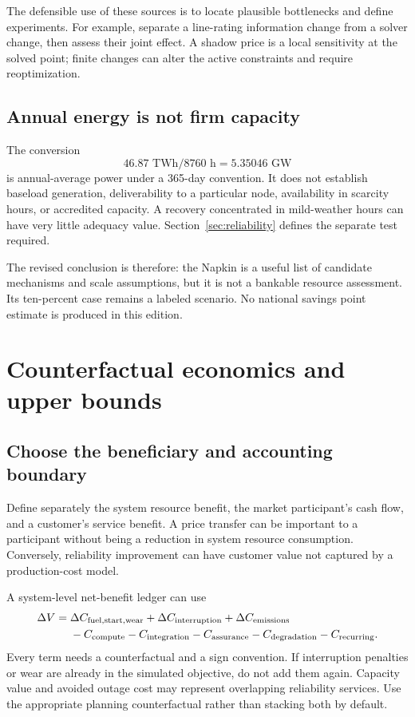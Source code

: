 \documentclass[11pt,letterpaper]{article}
\begin{document}
The defensible use of these sources is to locate plausible bottlenecks and define experiments. For example, separate a line-rating information change from a solver change, then assess their joint effect. A shadow price is a local sensitivity at the solved point; finite changes can alter the active constraints and require reoptimization.

\subsection{Annual energy is not firm capacity}
The conversion
\[
 46.87\text{ TWh}/8760\text{ h}=5.35046\text{ GW}
\]
is annual-average power under a 365-day convention. It does not establish baseload generation, deliverability to a particular node, availability in scarcity hours, or accredited capacity. A recovery concentrated in mild-weather hours can have very little adequacy value. Section~\ref{sec:reliability} defines the separate test required.

The revised conclusion is therefore: the Napkin is a useful list of candidate mechanisms and scale assumptions, but it is not a bankable resource assessment. Its ten-percent case remains a labeled scenario. No national savings point estimate is produced in this edition.

\section{Counterfactual economics and upper bounds}
\label{sec:economics}
\subsection{Choose the beneficiary and accounting boundary}
Define separately the system resource benefit, the market participant's cash flow, and a customer's service benefit. A price transfer can be important to a participant without being a reduction in system resource consumption. Conversely, reliability improvement can have customer value not captured by a production-cost model.

A system-level net-benefit ledger can use
\begin{equation}
\begin{aligned}
 \Delta V={}&\Delta C_{\rm fuel,start,wear}+\Delta C_{\rm interruption}
 +\Delta C_{\rm emissions}\\
 &-C_{\rm compute}-C_{\rm integration}-C_{\rm assurance}
 -C_{\rm degradation}-C_{\rm recurring}.
\end{aligned}
 \label{eq:value}
\end{equation}
Every term needs a counterfactual and a sign convention. If interruption penalties or wear are already in the simulated objective, do not add them again. Capacity value and avoided outage cost may represent overlapping reliability services. Use the appropriate planning counterfactual rather than stacking both by default.
\end{document}
